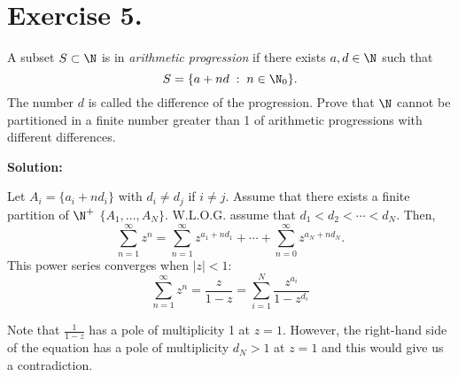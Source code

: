 \section*{Exercise 5.}

A subset $S\subset \N$ is in \textit{arithmetic progression} if there exists $a,d\in\N$ such that
\[ S = \{a+nd \;:\; n\in\N_0\}. \]
The number $d$ is called the difference of the progression. Prove that $\N$ cannot be partitioned in a finite number greater than 1 of arithmetic progressions with different differences.

\textbf{Solution:}

Let $A_i = \{a_i + n d_i\}$ with $d_i \neq d_j$ if $i\neq j$. Assume that there exists a finite partition of $\N^+$ $\{A_1,\ldots, A_N\}$. W.L.O.G. assume that $d_1 < d_2 < \cdots < d_N$. Then,
\[ \sum_{n = 1}^{\infty} z^n = \sum_{n = 1}^{\infty}z^{a_1+n d_1} + \cdots + \sum_{n = 0}^{\infty}z^{a_N+n d_N}. \]
This power series converges when $|z| < 1$:
\[ \sum_{n = 1}^{\infty} z^n = \frac{z}{1-z} = \sum_{i = 1}^N \frac{z^{a_i}}{1-z^{d_i}} \]

Note that $\frac{1}{1-z}$ has a pole of multiplicity 1 at $z = 1$. However, the right-hand side of the equation has a pole of multiplicity $d_N > 1$ at $z = 1$ and this would give us a contradiction.